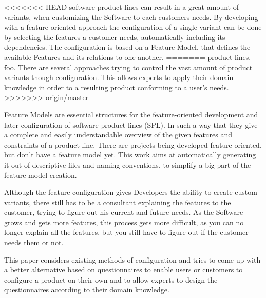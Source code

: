 % 
% 
% 
% 
<<<<<<< HEAD
 software product lines can result in a great amount of variants, when customizing the Software to each customers needs. By developing with a feature-oriented approach the configuration of a single variant can be done by selecting the features a customer needs, automatically including its dependencies. The configuration is based on a Feature Model, that defines the available Features and its relations to one another.
=======
 product lines. foo. There are several approaches trying to control the vast amount of product variants though configuration. This allows experts to apply their domain knowledge in order to a resulting product conforming to a user's needs.
>>>>>>> origin/master

Feature Models are essential structures for the feature-oriented development and later configuration of software product lines (SPL). In such a way that they give a complete and easily understandable overview of the given features and constraints of a product-line. There are projects being developed feature-oriented, but don't have a feature model yet. This work aims at automatically generating it out of descriptive files and naming conventions, to simplify a big part of the feature model creation.

Although the feature configuration gives  Developers the ability to create custom variants, there still has to be a consultant explaining the features to the customer, trying to figure out his current and future needs. As the Software grows and gets more features, this process gets more difficult, as you can no longer explain all the features, but you still have to figure out if the customer needs them or not.

This paper considers existing methods of configuration and tries to come up with a better alternative based on questionnaires to enable users or customers to configure a product on their own and to allow experts to design the questionnaires according to their domain knowledge.

